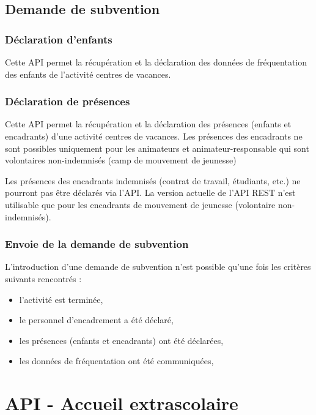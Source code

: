 \subsection{Demande de subvention}\label{api:ds_cdv}

\subsubsection{Déclaration d'enfants}\label{api:ds_cdv_enfants}
Cette API permet la récupération et la déclaration des données de fréquentation des enfants de l'activité centres de vacances. 

\subsubsection{Déclaration de présences}\label{api:ds_cdv_présences}
Cette API permet la récupération et la déclaration des présences (enfants et encadrants) d'une activité centres de vacances. Les présences des encadrants ne sont possibles uniquement pour les animateurs et animateur-responsable qui sont volontaires non-indemnisés (camp de mouvement de jeunesse)

\begin{attention}
Les présences des encadrants indemnisés (contrat de travail, étudiants, etc.) ne pourront pas être déclarés via l'API. La version actuelle de l'API REST n'est utilisable que pour les encadrants de mouvement de jeunesse (volontaire non-indemnisés). 
\end{attention}


\subsubsection{Envoie de la demande de subvention}
L'introduction d'une demande de subvention n’est possible qu’une fois les critères suivants rencontrés :
\begin{itemize}
    \item l'activité est terminée,
    \item le personnel d'encadrement a été déclaré, 
    \item les présences (enfants et encadrants) ont été déclarées, 
    \item les données de fréquentation ont été communiquées, 
\end{itemize}






\section{API - Accueil extrascolaire}\label{api:aes1}

